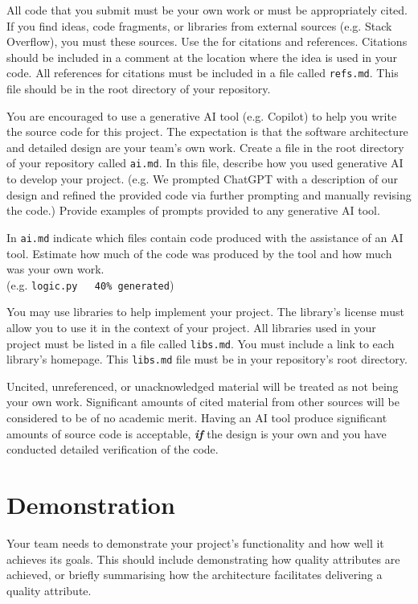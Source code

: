 \documentclass{csse4400}
\begin{document}
All code that you submit must be your own work or must be appropriately cited.
If you find ideas, code fragments, or libraries from external sources (e.g. Stack Overflow), you must  these sources.
Use the  for citations and references.
Citations should be included in a comment at the location where the idea is used in your code.
All references for citations must be included in a file called \texttt{refs.md}.
This file should be in the root directory of your repository.

You are encouraged to use a generative AI tool (e.g. Copilot) to help you write the source code for this project.
The expectation is that the software architecture and detailed design are your team's own work.
Create a file in the root directory of your repository called \texttt{ai.md}.
In this file, describe how you used generative AI to develop your project.
(e.g. We prompted ChatGPT with a description of our design
and refined the provided code via further prompting and manually revising the code.)
Provide examples of prompts provided to any generative AI tool.

In \texttt{ai.md} indicate which files contain code produced with the assistance of an AI tool.
Estimate how much of the code was produced by the tool and how much was your own work.\\
(e.g. \texttt{logic.py ~~40\% generated})

You may use libraries to help implement your project.
The library's license must allow you to use it in the context of your project.
All libraries used in your project must be listed in a file called \texttt{libs.md}.
You must include a link to each library's homepage.
This \texttt{libs.md} file must be in your repository's root directory.

Uncited, unreferenced, or unacknowledged material will be treated as not being your own work.
Significant amounts of cited material from other sources will be considered to be of no academic merit.
Having an AI tool produce significant amounts of source code is acceptable,
\textbf{\textit{if}} the design is your own and you have conducted detailed verification of the code.


\section{Demonstration}
Your team needs to demonstrate your project's functionality and how well it achieves its goals.
This should include demonstrating how quality attributes are achieved,
or briefly summarising how the architecture facilitates delivering a quality attribute.
\end{document}
